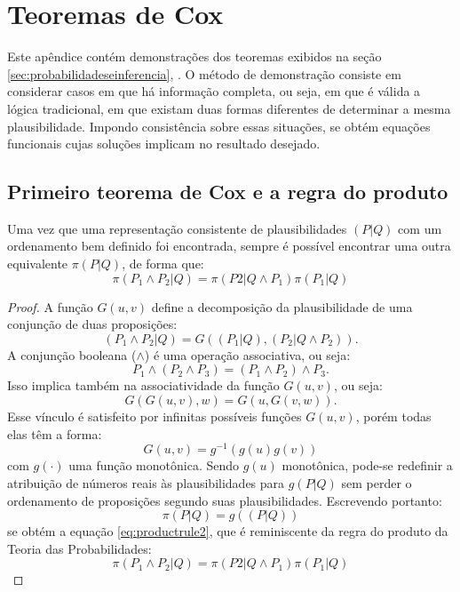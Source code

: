 \chapter{Teoremas de Cox}
\label{ap:provateoremas}

Este apêndice contém demonstrações dos teoremas exibidos na seção \ref{sec:probabilidadeseinferencia}, \emph{}. O método de demonstração consiste em considerar casos em que há informação completa, ou seja, em que é válida a lógica tradicional, em que existam duas formas diferentes de determinar a mesma plausibilidade. Impondo consistência sobre essas situações, se obtém equações funcionais cujas soluções implicam no resultado desejado. 

\section{Primeiro teorema de Cox e a regra do produto} 
\begin{Teorema}
    Uma vez que uma representação consistente de plausibilidades $(P|Q)$ com um ordenamento bem definido foi encontrada, sempre é possível encontrar uma outra equivalente $\pi(P|Q)$, de forma que:
    \begin{equation}
	\label{eq:productrule2}
	\pi(P_1\wedge P_2|Q) = \pi(P2 | Q \wedge P_1) \pi(P_1| Q)
    \end{equation}
\begin{proof}
A função $G(u,v)$ define a decomposição da plausibilidade de uma conjunção de duas proposições:
\[
 (P_1\wedge P_2|Q) = G((P_1|Q), (P_2|Q\wedge P_2)).
\]
A conjunção booleana ($\wedge$) é uma operação associativa, ou seja:
\[
  P_1\wedge (P_2 \wedge P_3) =  (P_1\wedge P_2) \wedge P_3.
\] 
Isso implica também na associatividade da função $G(u,v)$, ou seja:
\[
  G(G(u,v),w) = G(u,G(v,w)). 
\]
Esse vínculo é satisfeito por infinitas possíveis funções $G(u,v)$, porém todas elas \cite{Aczel1975, ACaticha2008} têm a forma:
\[
  G(u,v)  = g^{-1}(g(u) g(v)) 
\]
com $g(\cdot)$ uma função monotônica. Sendo $g(u)$ monotônica, pode-se redefinir a atribuição de números reais às plausibilidades para $g(P|Q)$ sem perder o ordenamento de proposições segundo suas plausibilidades. Escrevendo portanto:
\[
 \pi(P|Q) = g((P|Q))
\]
se obtém a equação \eqref{eq:productrule2}, que é reminiscente da regra do produto da Teoria das Probabilidades:
\[
  \pi(P_1\wedge P_2|Q) = \pi(P2 | Q \wedge P_1) \pi(P_1| Q)
\]
\end{proof}
\end{Teorema}

